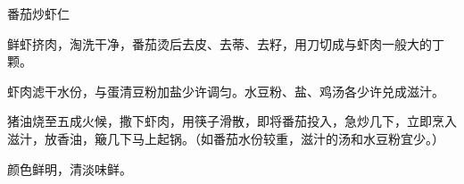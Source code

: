 %
%
%
%
%
%
%
\begin{recipe}{番茄炒虾仁}

\ingredients


\preparation

\step 鲜虾挤肉，淘洗干净，番茄烫后去皮、去蒂、去籽，用刀切成与虾肉一般大的丁
颗。

\step 虾肉滤干水份，与蛋清豆粉加盐少许调匀。水豆粉、盐、鸡汤各少许兑成滋汁。

\step 猪油烧至五成火候，撒下虾肉，用筷子滑散，即将番茄投入，急炒几下，立即烹入
滋汁，放香油，簸几下马上起锅。（如番茄水份较重，滋汁的汤和水豆粉宜少。）

\features

颜色鲜明，清淡味鲜。

\end{recipe}

